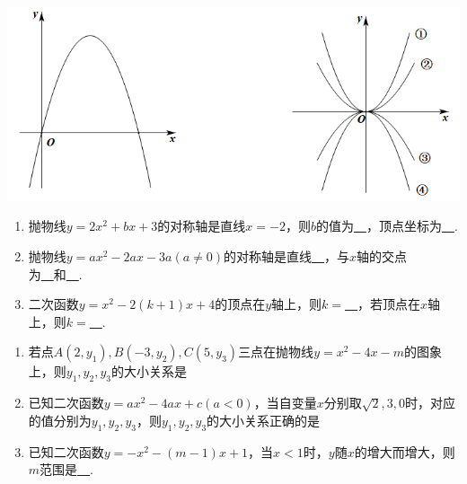 \documentclass[10pt]{ctexart}
\begin{document}
\includegraphics[scale=0.6]{figure/l-2.PNG} 
\begin{dkyi}{}{}
  \begin{enumerate}[(1)]
  \item 抛物线$y=2x^2+bx+3$的对称轴是直线$x=-2$，则$b$的值为\underline{~\hspace{1cm}~}，顶点坐标为\underline{~\hspace{1cm}~}.
  \item 抛物线$y=ax^2-2ax-3a(a\neq 0)$的对称轴是直线\underline{~\hspace{1cm}~}，与$x$轴的交点为\underline{~\hspace{1cm}~}和\underline{~\hspace{1cm}~}.
  \item 二次函数$y=x^2-2(k+1)x+4$的顶点在$y$轴上，则$k=$\underline{~\hspace{1cm}~}，若顶点在$x$轴上，则$k=$\underline{~\hspace{1cm}~}.
  \end{enumerate}
\end{dkyi}
\begin{dkyi}{}{}
  \begin{enumerate}[(1)]
  \item 若点$A(2,y_1),B(-3,y_2),C(5,y_3)$三点在抛物线$y=x^2-4x-m$的图象上，则$y_1,y_2,y_3$的大小关系是
  
  \item 已知二次函数$y=ax^2-4ax+c(a<0)$，当自变量$x$分别取$\sqrt{2},3,0$时，对应的值分别为$y_1,y_2,y_3$，则$y_1,y_2,y_3$的大小关系正确的是
 
 
  \item 已知二次函数$y=-x^2-(m-1)x+1$，当$x<1$时，$y$随$x$的增大而增大，则$m$范围是\underline{~\hspace{1cm}~}.
  \end{enumerate}
\end{dkyi}
\end{document}
